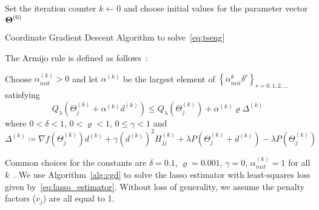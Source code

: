 \begin{algorithm}[htbp]
	\SetAlgoLined
	Set the iteration counter $k \leftarrow 0$ and choose initial values for the parameter vector $\boldsymbol{\Theta}^{(0)}$\;
\caption{Coordinate Gradient Descent Algorithm to solve~\eqref{eq:tseng}} \label{alg:cgd}
\end{algorithm}

\FloatBarrier

The Armijo rule is defined as follows~\citep{tseng2009coordinate}:
\begin{tcolorbox}
	Choose $\alpha_{init}^{(k)}>0$ and let $\alpha^{(k)}$ be the largest element of $\left\lbrace \alpha_{init}^k \delta^r \right\rbrace_{r = 0,1,2,\ldots} $ satisfying
	\begin{equation}
	Q_{\lambda}(\Theta_j^{(k)} + \alpha^{(k)} d^{(k)}) \leq Q_{\lambda} (\Theta_j^{(k)}) + \alpha^{(k)}\varrho \Delta^{(k)}
	\end{equation}
	where $0 < \delta <1$, $0 < \varrho <1$, $0 \leq \gamma < 1$ and
	\begin{equation}
	\Delta^{(k)} \coloneqq \nabla f(\Theta_j^{(k)})d^{(k)} + \gamma (d^{(k)})^2 H^{(k)}_{jj} + \lambda P(\Theta_j^{(k)} + d^{(k)}) - \lambda P(\Theta_j^{(k)})
	\end{equation}
\end{tcolorbox}
Common choices for the constants are $\delta=0.1$, $\varrho=0.001$, $\gamma = 0$, $\alpha_{init}^{(k)} = 1$ for all $k$~\citep{bertsekas1999nonlinear}.
We use Algorithm~\ref{alg:cgd} to solve the lasso estimator with least-squares loss given by~\eqref{eq:lasso_estimator}. Without loss of generality, we assume the penalty factors ($v_j$) are all equal to 1. 


